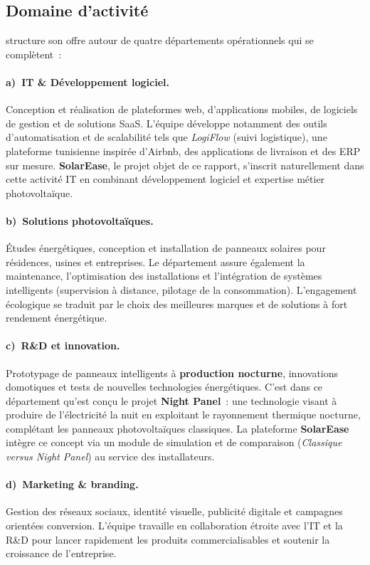 \subsection{Domaine d'activité}

\organisme{} structure son offre autour de quatre départements
opérationnels qui se complètent~:

\paragraph{a)~IT \& Développement logiciel.}
Conception et réalisation de plateformes web, d'applications mobiles,
de logiciels de gestion et de solutions SaaS. L'équipe développe
notamment des outils d'automatisation et de scalabilité tels que
\textit{LogiFlow} (suivi logistique), une plateforme tunisienne
inspirée d'Airbnb, des applications de livraison et des ERP sur mesure.
\textbf{SolarEase}, le projet objet de ce rapport, s'inscrit naturellement
dans cette activité IT en combinant développement logiciel et expertise
métier photovoltaïque.

\paragraph{b)~Solutions photovoltaïques.}
Études énergétiques, conception et installation de panneaux solaires
pour résidences, usines et entreprises. Le département assure également
la maintenance, l'optimisation des installations et l'intégration de
systèmes intelligents (supervision à distance, pilotage de la
consommation). L'engagement écologique se traduit par le choix des
meilleures marques et de solutions à fort rendement énergétique.

\paragraph{c)~R\&D et innovation.}
Prototypage de panneaux intelligents à \textbf{production nocturne}, innovations
domotiques et tests de nouvelles technologies énergétiques. C'est dans ce
département qu'est conçu le projet \textbf{Night Panel}~: une technologie visant
à produire de l'électricité la nuit en exploitant le rayonnement thermique
nocturne, complétant les panneaux photovoltaïques classiques. La plateforme
\textbf{SolarEase} intègre ce concept via un module de simulation et de
comparaison (\textit{Classique versus Night Panel}) au service des installateurs.

\paragraph{d)~Marketing \& branding.}
Gestion des réseaux sociaux, identité visuelle, publicité digitale et
campagnes orientées conversion. L'équipe travaille en collaboration
étroite avec l'IT et la R\&D pour lancer rapidement les produits
commercialisables et soutenir la croissance de l'entreprise.

